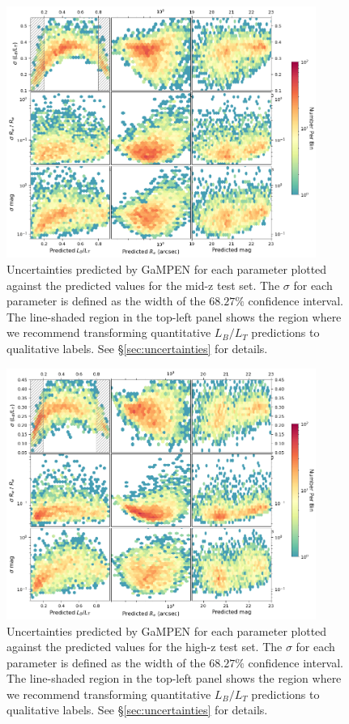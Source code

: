 \documentclass[linenumbers,twocolumn,twocolappendix]{aastex631}
\newcommand\gampen{GaMPEN}
\begin{document}
\begin{CJK*}{UTF8}{gbsn}
\begin{figure}[htb]
    \centering
    \includegraphics[width = 0.9\textwidth]{2d_uncer_mid_z.png}
    \caption{Uncertainties predicted by \gampen{} for each parameter plotted against the predicted values for the mid-z test set. The $\sigma$ for each parameter is defined as the width of the $68.27\%$ confidence interval. The line-shaded region in the top-left panel shows the region where we recommend transforming quantitative $L_B/L_T$ predictions to qualitative labels. See \S \ref{sec:uncertainties} for details.}
    \label{fig:2d_uncer_mid_z}
\end{figure}

\begin{figure}[htb]
    \centering
    \includegraphics[width = 0.9\textwidth]{2d_uncer_high_z.png}
    \caption{Uncertainties predicted by \gampen{} for each parameter plotted against the predicted values for the high-z test set. The $\sigma$ for each parameter is defined as the width of the $68.27\%$ confidence interval. The line-shaded region in the top-left panel shows the region where we recommend transforming quantitative $L_B/L_T$ predictions to qualitative labels. See \S \ref{sec:uncertainties} for details.}
    \label{fig:2d_uncer_high_z}
\end{figure}


\end{CJK*}
\end{document}
